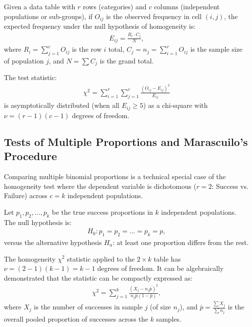 \begin{teorema}
	Given a data table with $r$ rows (categories) and $c$ columns (independent populations or sub-groups), if $O_{ij}$ is the observed frequency in cell $(i,j)$, the expected frequency under the null hypothesis of homogeneity is:
	\begin{align}
		E_{ij} = \frac{R_i \cdot C_j}{N},
	\end{align}
	where $R_i = \sum_{j=1}^c O_{ij}$ is the row $i$ total, $C_j = n_j = \sum_{i=1}^r O_{ij}$ is the sample size of population $j$, and $N = \sum C_j$ is the grand total.
	
	The test statistic:
	\begin{align}
		\chi^2 = \sum_{i=1}^r \sum_{j=1}^c \frac{(O_{ij} - E_{ij})^2}{E_{ij}}
	\end{align}
	is asymptotically distributed (when all $E_{ij} \geq 5$) as a chi-square with $\nu = (r-1)(c-1)$ degrees of freedom.
\end{teorema}

\subsection{Tests of Multiple Proportions and Marascuilo's Procedure}

Comparing multiple binomial proportions is a technical special case of the homogeneity test where the dependent variable is dichotomous ($r=2$: Success vs. Failure) across $c = k$ independent populations.

\begin{definicion}
	Let $p_1, p_2, \ldots, p_k$ be the true success proportions in $k$ independent populations. The null hypothesis is:
	\begin{align}
		H_0: p_1 = p_2 = \ldots = p_k = p,
	\end{align}
	versus the alternative hypothesis $H_a$: at least one proportion differs from the rest.
	
	The homogeneity $\chi^2$ statistic applied to the $2 \times k$ table has $\nu = (2-1)(k-1) = k-1$ degrees of freedom. It can be algebraically demonstrated that the statistic can be compactly expressed as:
	\begin{align}
		\chi^2 = \sum_{j=1}^k \frac{(X_j - n_j \bar{p})^2}{n_j \bar{p}(1-\bar{p})},
		\label{eq:chi2_k_prop}
	\end{align}
	where $X_j$ is the number of successes in sample $j$ (of size $n_j$), and $\bar{p} = \frac{\sum X_j}{\sum n_j}$ is the overall pooled proportion of successes across the $k$ samples.
\end{definicion}


